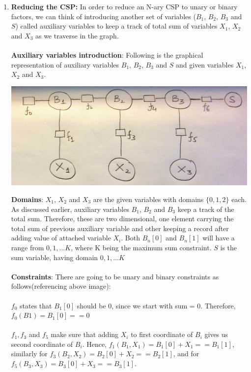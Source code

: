 \documentclass[12pt]{article}
\begin{document}
\begin{enumerate}[label=(\alph*)]
  \item \textbf{Reducing the CSP:} In order to reduce an N-ary CSP to unary or binary factors, we can think of introducing another set of variables ($B_1$, $B_2$, $B_3$ and $S$) called auxiliary variables to keep a track of total sum of variables $X_1$, $X_2$ and $X_3$ as we traverse in the graph.\\ \\
  \textbf{Auxiliary variables introduction}: Following is the graphical representation of auxiliary variables $B_1$, $B_2$, $B_3$ and $S$ and given variables $X_1$, $X_2$ and $X_3$.
  \begin{center}
  \includegraphics[scale=0.1]{IMG_2240.jpg}
  \end{center}
  \textbf{Domains}: $X_1$, $X_2$ and $X_3$ are the given variables with domains $\{0, 1, 2\}$ each. As discussed earlier, auxiliary variables $B_1$, $B_2$ and $B_3$ keep a track of the total sum. Therefore, these are two dimensional, one element carrying the total sum of previous auxiliary variable and other keeping a record after adding value of attached variable $X_i$. Both $B_n[0]$ and $B_n[1]$ will have a range from $0, 1, ... K$, where K being the maximum sum constraint. $S$ is the sum variable, having domain $0, 1, ... K$ \\ \\
  \textbf{Constraints}: There are going to be unary and binary constraints as follows(referencing above image): \\ \\
  $f_0$ states that $B_1[0]$ should be 0, since we start with sum = 0. Therefore, $f_0(B1) = B_1[0] == 0$ \\ \\
  $f_1, f_3$ and $f_5$ make sure that adding $X_i$ to first coordinate of $B_i$ gives us second coordinate of $B_i$. Hence, $f_1(B_1, X_1) = B_1[0] + X_1 == B_1[1]$, similarly for $f_3(B_2, X_2) = B_2[0] + X_2 == B_2[1]$, and for $f_5(B_3, X_3) = B_3[0] + X_3 == B_3[1]$. \\ \\

\end{enumerate}
\end{document}
